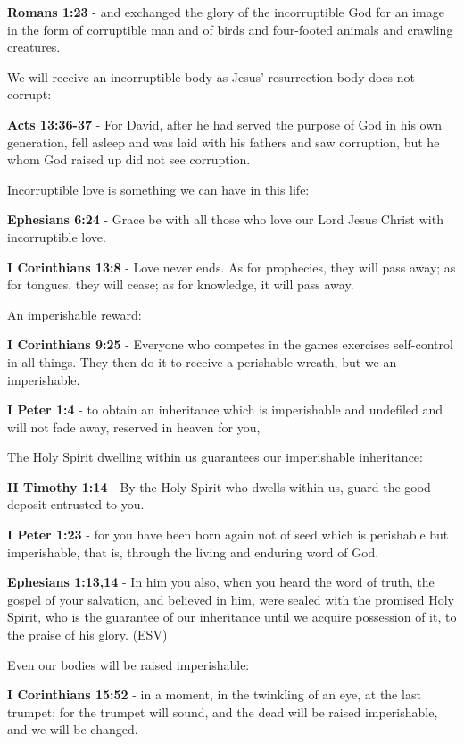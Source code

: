 \documentclass[11pt]{article}
\begin{document}
\textbf{Romans 1:23} - and exchanged the glory of the incorruptible God for an image in the form of corruptible man and of birds and four-footed animals and crawling creatures.

We will receive an incorruptible body as Jesus' resurrection body does not corrupt:

\textbf{Acts 13:36-37} - For David, after he had served the purpose of God in his own generation, fell asleep and was laid with his fathers and saw corruption, but he whom God raised up did not see corruption.

Incorruptible love is something we can have in this life:

\textbf{Ephesians 6:24} - Grace be with all those who love our Lord Jesus Christ with incorruptible love.

\textbf{I Corinthians 13:8} - Love never ends. As for prophecies, they will pass away; as for tongues, they will cease; as for knowledge, it will pass away.

An imperishable reward:

\textbf{I Corinthians 9:25} - Everyone who competes in the games exercises self-control in all things. They then do it to receive a perishable wreath, but we an imperishable.

\textbf{I Peter 1:4} - to obtain an inheritance which is imperishable and undefiled and will not fade away, reserved in heaven for you,

The Holy Spirit dwelling within us guarantees our imperishable inheritance:

\textbf{II Timothy 1:14} - By the Holy Spirit who dwells within us, guard the good deposit entrusted to you.

\textbf{I Peter 1:23} - for you have been born again not of seed which is perishable but imperishable, that is, through the living and enduring word of God.

\textbf{Ephesians 1:13,14} -  In him you also, when you heard the word of truth, the gospel of your salvation, and believed in him, were sealed with the promised Holy Spirit, who is the guarantee of our inheritance until we acquire possession of it, to the praise of his glory.  (ESV)

Even our bodies will be raised imperishable:

\textbf{I Corinthians 15:52} - in a moment, in the twinkling of an eye, at the last trumpet; for the trumpet will sound, and the dead will be raised imperishable, and we will be changed.
\end{document}
